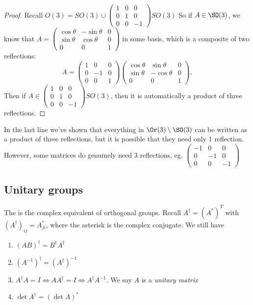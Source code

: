 \documentclass[a4paper]{article}
\begin{document}
  \begin{proof}
    Recall $O(3) = SO(3) \cup 
    \begin{pmatrix}
      1 & 0 & 0\\
      0 & 1 & 0\\
      0 & 0 & -1
    \end{pmatrix}SO(3)$
    So if $A\in \SO(3)$, we know that $A = 
    \begin{pmatrix}
      \cos\theta & -\sin\theta & 0\\
      \sin\theta & \cos\theta & 0\\
      0 & 0 & 1
    \end{pmatrix}$ in some basis, which is a composite of two reflections:
    \[
      A = 
      \begin{pmatrix}
        1 & 0 & 0\\
        0 & -1 & 0\\
        0 & 0 & 1
      \end{pmatrix}
      \begin{pmatrix}
        \cos\theta & \sin\theta & 0\\
        \sin\theta & -\cos\theta & 0\\
        0 & 0 & 1
      \end{pmatrix},
    \]
    Then if $A\in \begin{pmatrix}
      1 & 0 & 0\\
      0 & 1 & 0\\
      0 & 0 & -1
    \end{pmatrix}SO(3)$, then it is automatically a product of three reflections.
  \end{proof}
  \note In the last line we've shown that everything in $\Or(3)\setminus \SO(3)$ can be written as a product of three reflections, but it is possible that they need only 1 reflection. However, some matrices do genuinely need 3 reflections, eg.
  $\begin{pmatrix}
    -1 & 0 & 0\\
    0 & -1 & 0\\
    0 & 0 & -1
  \end{pmatrix}$

  \subsection{Unitary groups}
  The is the complex equivalent of orthogonal groups. Recall $A^\dagger = (A^*)^T$ with $(A^\dagger)_{ij} = A_{ji}^*$, where the asterisk is the complex conjugate. We still have
  \begin{enumerate}
    \item $(AB)^\dagger = B^\dagger A^\dagger$
    \item $(A^{-1})^\dagger = (A^\dagger)^{-1}$
    \item $A^\dagger A = I \Leftrightarrow AA^\dagger = I \Leftrightarrow A^\dagger A^{-1}$. We say $A$ is a \emph{unitary matrix}
    \item $\det A^{\dagger} = (\det A)^*$
  \end{enumerate}
\end{document}
